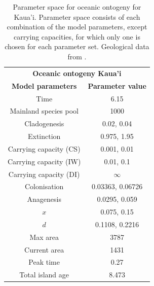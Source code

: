 \begin{table}[ht]
    \centering
    \caption{Parameter space for oceanic ontogeny for Kaua'i. Parameter space consists of each combination of the model parameters, except carrying capacities, for which only one is chosen for each parameter set.  Geological data from \cite{lim_true_2017}.}
    \begin{tabular}{ c | c }
        \multicolumn{2}{c}{\textbf{Oceanic ontogeny Kaua'i}} \\
        \textbf{Model parameters} & \textbf{Parameter value} \\ 
        \hline
        \hline
        Time & 6.15 \\
        \hline
        Mainland species pool & 1000 \\
        \hline
        Cladogenesis & 0.02, 0.04 \\
        \hline
        Extinction & 0.975, 1.95 \\
        \hline
        Carrying capacity (CS) & 0.001, 0.01 \\
        \hline
        Carrying capacity (IW) & 0.01, 0.1 \\
        \hline
        Carrying capacity (DI) & $\infty$ \\
        \hline
        Colonisation & 0.03363, 0.06726 \\
        \hline
        Anagenesis & 0.0295, 0.059 \\
        \hline
        $x$ & 0.075, 0.15 \\
        \hline
        $d$ & 0.1108, 0.2216 \\
        \hline
        Max area & 3787 \\
        \hline
        Current area & 1431 \\
        \hline
        Peak time & 0.27 \\
        \hline
        Total island age & 8.473 \\
    \end{tabular}
    \label{tab:oceanic_ontogeny_old}
\end{table}

